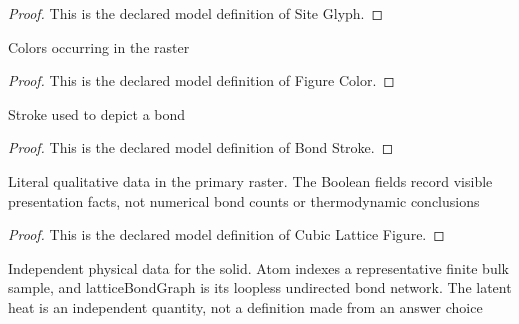 \begin{proof}
  This is the declared model definition of Site Glyph.
\end{proof}
\begin{definition}
  \label{def:physics:phyx-mini-0625:phyxminiproblems-problemphyxmini0625-figurecolor}
  Colors occurring in the raster
\end{definition}
\begin{proof}
  This is the declared model definition of Figure Color.
\end{proof}
\begin{definition}
  \label{def:physics:phyx-mini-0625:phyxminiproblems-problemphyxmini0625-bondstroke}
  Stroke used to depict a bond
\end{definition}
\begin{proof}
  This is the declared model definition of Bond Stroke.
\end{proof}
\begin{definition}
  \label{def:physics:phyx-mini-0625:phyxminiproblems-problemphyxmini0625-cubiclatticefigure}
  Literal qualitative data in the primary raster. The Boolean fields record visible presentation facts, not numerical bond counts or thermodynamic conclusions
\end{definition}
\begin{proof}
  This is the declared model definition of Cubic Lattice Figure.
\end{proof}
\begin{definition}
  \label{def:physics:phyx-mini-0625:phyxminiproblems-problemphyxmini0625-monatomiccubicsolidsetup}
  Independent physical data for the solid. Atom indexes a representative finite bulk sample, and latticeBondGraph is its loopless undirected bond network. The latent heat is an independent quantity, not a definition made from an answer choice
\end{definition}
